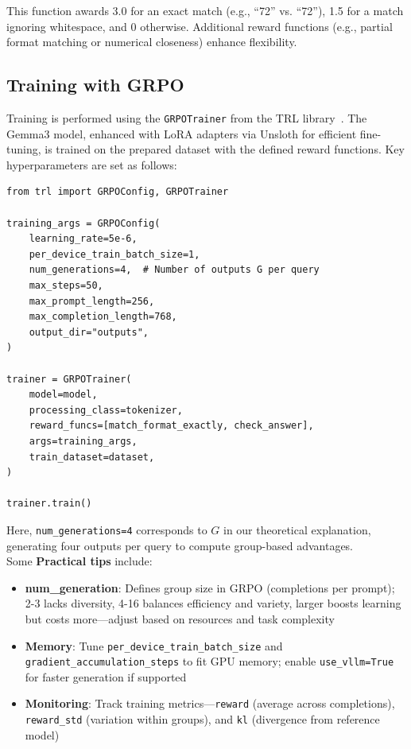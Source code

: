 \documentclass{article}
\begin{document}
This function awards 3.0 for an exact match (e.g., ``72'' vs. ``72''), 1.5 for a match ignoring whitespace, and 0 otherwise. Additional reward functions (e.g., partial format matching or numerical closeness) enhance flexibility.

\subsection*{Training with GRPO}

Training is performed using the \texttt{GRPOTrainer} from the TRL library~\cite{trl}. The Gemma3 model, enhanced with LoRA adapters via Unsloth for efficient fine-tuning, is trained on the prepared dataset with the defined reward functions. Key hyperparameters are set as follows:

\begin{verbatim}
from trl import GRPOConfig, GRPOTrainer

training_args = GRPOConfig(
    learning_rate=5e-6,
    per_device_train_batch_size=1,
    num_generations=4,  # Number of outputs G per query
    max_steps=50,
    max_prompt_length=256,
    max_completion_length=768,
    output_dir="outputs",
)

trainer = GRPOTrainer(
    model=model,
    processing_class=tokenizer,
    reward_funcs=[match_format_exactly, check_answer],
    args=training_args,
    train_dataset=dataset,
)

trainer.train()
\end{verbatim}

Here, \texttt{num\_generations=4} corresponds to \( G \) in our theoretical explanation, generating four outputs per query to compute group-based advantages.\\

Some \textbf{Practical tips} include:
\begin{itemize}
    \item \textbf{num\_generation}: Defines group size in GRPO (completions per prompt); 2-3 lacks diversity, 4-16 balances efficiency and variety, larger boosts learning but costs more—adjust based on resources and task complexity
    \item \textbf{Memory}: Tune \texttt{per\_device\_train\_batch\_size} and \texttt{gradient\_accumulation\_steps} to fit GPU memory; enable \texttt{use\_vllm=True} for faster generation if supported
    \item \textbf{Monitoring}: Track training metrics—\texttt{reward} (average across completions), \texttt{reward\_std} (variation within groups), and \texttt{kl} (divergence from reference model)
\end{itemize}
\end{document}
